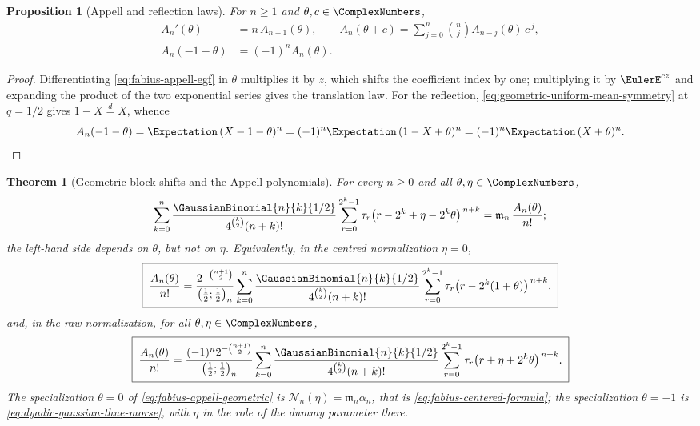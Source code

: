 \documentclass[11pt,a4paper,oneside,openany]{book}
\newtheorem{theorem}{Theorem}[chapter]
\newtheorem{proposition}[proposition]{Proposition}
\theoremstyle{definition}
\theoremstyle{remark}
\begin{document}
\begin{proposition}[Appell and reflection laws]\label{prop:fabius-appell-laws}
For $n\ge1$ and $\theta,c\in\ComplexNumbers$,
\begin{align}
 A_n'(\theta)&=n\,A_{n-1}(\theta),
 \qquad
 A_n(\theta+c)=\sum_{j=0}^{n}\binom njA_{n-j}(\theta)\,c^{\,j},
 \label{eq:fabius-appell-derivative}\\
 A_n(-1-\theta)&=(-1)^nA_n(\theta).
 \label{eq:fabius-appell-reflection}
\end{align}
\end{proposition}

\begin{proof}
Differentiating \eqref{eq:fabius-appell-egf} in $\theta$ multiplies it by $z$,
which shifts the coefficient index by one; multiplying it by $\EulerE^{cz}$ and
expanding the product of the two exponential series gives the translation law.
For the reflection, \eqref{eq:geometric-uniform-mean-symmetry} at $q=1/2$ gives
$1-X\overset d=X$, whence
\[
 A_n(-1-\theta)=\Expectation\,(X-1-\theta)^n
 =(-1)^n\Expectation\,(1-X+\theta)^n
 =(-1)^n\Expectation\,(X+\theta)^n. \qedhere
\]
\end{proof}

\begin{theorem}[Geometric block shifts and the Appell polynomials]\label{thm:fabius-appell-geometric-shift}
For every $n\ge0$ and all $\theta,\eta\in\ComplexNumbers$,
\begin{equation}\label{eq:fabius-appell-geometric}
 \sum_{k=0}^{n}\frac{\GaussianBinomial{n}{k}{1/2}}{4^{\binom k2}(n+k)!}
 \sum_{r=0}^{2^k-1}\tau_r
 \bigl(r-2^k+\eta-2^k\theta\bigr)^{\,n+k}
 =\mathfrak m_n\,\frac{A_n(\theta)}{n!} ;
\end{equation}
the left-hand side depends on $\theta$, but not on $\eta$.  Equivalently, in the
centred normalization $\eta=0$,
\begin{equation}\label{eq:fabius-appell-centred}
 \boxed{\;
 \frac{A_n(\theta)}{n!}
 =\frac{2^{-\binom{n+1}{2}}}{\left(\frac12;\frac12\right)_n}
 \sum_{k=0}^{n}\frac{\GaussianBinomial{n}{k}{1/2}}{4^{\binom k2}(n+k)!}
 \sum_{r=0}^{2^k-1}\tau_r\bigl(r-2^k(1+\theta)\bigr)^{\,n+k},\;}
\end{equation}
and, in the raw normalization, for all $\theta,\eta\in\ComplexNumbers$,
\begin{equation}\label{eq:fabius-appell-raw}
 \boxed{\;
 \frac{A_n(\theta)}{n!}
 =\frac{(-1)^n2^{-\binom{n+1}{2}}}{\left(\frac12;\frac12\right)_n}
 \sum_{k=0}^{n}\frac{\GaussianBinomial{n}{k}{1/2}}{4^{\binom k2}(n+k)!}
 \sum_{r=0}^{2^k-1}\tau_r\bigl(r+\eta+2^k\theta\bigr)^{\,n+k}.\;}
\end{equation}
The specialization $\theta=0$ of \eqref{eq:fabius-appell-geometric} is
$\mathcal N_n(\eta)=\mathfrak m_n\alpha_n$, that is
\eqref{eq:fabius-centered-formula}; the specialization $\theta=-1$ is
\eqref{eq:dyadic-gaussian-thue-morse}, with $\eta$ in the role of the dummy
parameter there.
\end{theorem}
\end{document}
